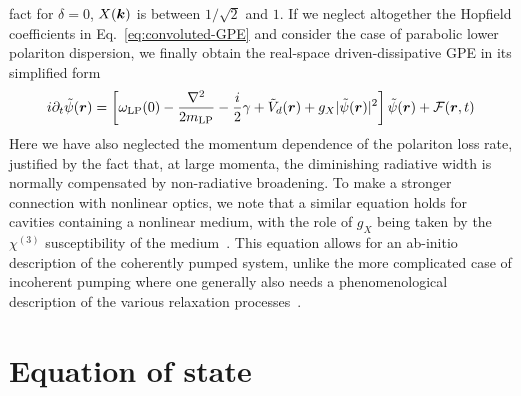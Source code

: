 fact for $\delta = 0$, $X(\bm{k})$ is between $1/\sqrt{2}$ and $1$. If we
neglect altogether the Hopfield coefficients in
Eq.~\eqref{eq:convoluted-GPE} and consider the case of parabolic lower
polariton dispersion, we finally obtain the real-space
driven-dissipative GPE in its simplified form
%
\begin{equation}\label{eq:rspace-GPE}
  i \partial_t \tilde{\psi}(\bm{r}) = \left[ \omega_{\text{LP}}(0) - \frac{\nabla^2}{2m_{\text{LP}}} - \frac{i}{2}\gamma  + \tilde{V}_d(\bm{r}) + g_X \vert \tilde{\psi}(\bm{r}) \vert^2\right] \tilde{\psi}(\bm{r})
  + \mathcal{F}(\bm{r},t)
\end{equation}
% 
Here we have also neglected the momentum dependence of the polariton
loss rate, justified by the fact that, at large momenta, the
diminishing radiative width is normally compensated by non-radiative
broadening.  To make a stronger connection with nonlinear optics, we
note that a similar equation holds for cavities containing a nonlinear
medium, with the role of $g_X$ being taken by the $\chi^{(3)}$
susceptibility of the medium~\cite{boyd2003nonlinear}. This equation
allows for an ab-initio description of the coherently pumped system,
unlike the more complicated case of incoherent pumping where one
generally also needs a phenomenological description of the various
relaxation processes~\cite{Keeling_2007}.



\section{Equation of state}
\label{sec:eq-state}

